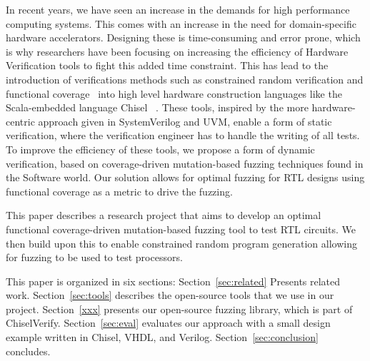 \documentclass[conference]{IEEEtran}
\begin{document}
In recent years, we have seen an increase in the demands for high performance computing systems.  
This comes with an increase in the need for domain-specific hardware accelerators.  
Designing these is time-consuming and error prone, which is why researchers have been focusing on increasing the efficiency of Hardware Verification tools to fight this added time constraint.
This has lead to the introduction of verifications methods such as constrained random verification and functional coverage~\cite{verify:chisel:2020, dobis2021opensource} into high level hardware construction languages like the Scala-embedded language Chisel~\cite{chisel:dac2012, chisel:book} .
These tools, inspired by the more hardware-centric approach given in SystemVerilog and UVM, enable a form of static verification, where the verification engineer has to handle the writing of all tests.
To improve the efficiency of these tools, we propose a form of dynamic verification, based on coverage-driven mutation-based fuzzing techniques found in the Software world.
Our solution allows for optimal fuzzing for RTL designs using functional coverage as a metric to drive the fuzzing.

This paper describes a research project that aims to develop an optimal functional coverage-driven mutation-based fuzzing tool to test RTL circuits.
We then build upon this to enable constrained random program generation allowing for fuzzing to be used to test processors.

This paper is organized in six sections: %
Section~\ref{sec:related}  Presents related work.
Section~\ref{sec:tools} describes the open-source tools that we use in our project.
Section~\ref{xxx} presents our open-source fuzzing library, which is part of ChiselVerify.
Section~\ref{sec:eval} evaluates our approach with a small design example written in Chisel, VHDL,
and Verilog.
Section~\ref{sec:conclusion} concludes.
\end{document}
